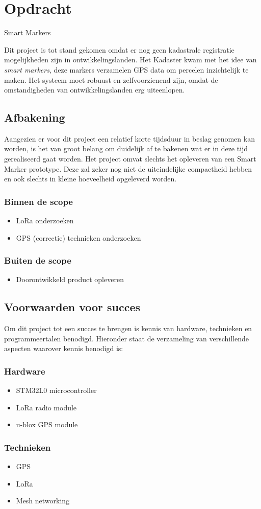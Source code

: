 \section{Opdracht}
\label{sec:opdracht}
Smart Markers

Dit project is tot stand gekomen omdat er nog geen kadastrale registratie
mogelijkheden zijn in ontwikkelingslanden. Het Kadaster kwam met het idee van
\textit{smart markers}, deze markers verzamelen GPS data om percelen inzichtelijk
te maken. Het systeem moet robuust en zelfvoorzienend zijn, omdat de omstandigheden
van ontwikkelingslanden erg uiteenlopen.

\subsection{Afbakening}
Aangezien er voor dit project een relatief korte tijdsduur in beslag genomen
kan worden, is het van groot belang om duidelijk af te bakenen wat er in deze
tijd gerealiseerd gaat worden.
Het project omvat slechts het opleveren van een Smart Marker prototype. Deze zal 
zeker nog niet de uiteindelijke compactheid hebben en ook slechts in kleine 
hoeveelheid opgeleverd worden.

\subsubsection{Binnen de scope}
\begin{itemize}
    \item LoRa onderzoeken
    \item GPS (correctie) technieken onderzoeken
\end{itemize}

\subsubsection{Buiten de scope}
\begin{itemize}
    \item Doorontwikkeld product opleveren
\end{itemize}

\subsection{Voorwaarden voor succes}
Om dit project tot een succes te brengen is kennis van hardware, technieken
en programmeertalen benodigd. Hieronder staat de verzameling van verschillende
aspecten waarover kennis benodigd is:
\subsubsection{Hardware}
\begin{itemize}
    \item STM32L0 microcontroller
    \item LoRa radio module
    \item u-blox GPS module
\end{itemize}
\subsubsection{Technieken}
\begin{itemize}
    \item GPS
    \item LoRa
    \item Mesh networking
\end{itemize}

